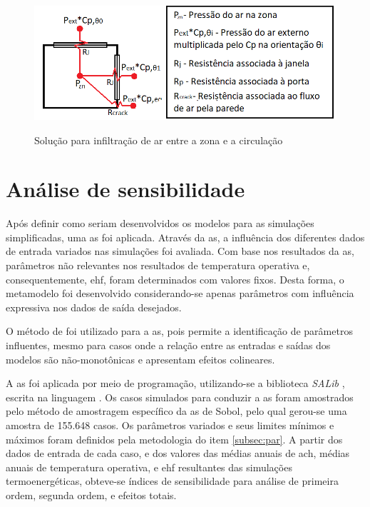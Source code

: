 \documentclass[brazil,hardcopy,openany]{ufscthesis} %
\begin{document}
\begin{figure}[H]
	\centering
	\caption{Solução para infiltração de ar entre a zona e a circulação}
	\includegraphics[width=.8\linewidth]{img/AFN_crack2.png}
	\label{fig:AFN_crack}
\end{figure}

\section{Análise de sensibilidade}

Após definir como seriam desenvolvidos os modelos para as simulações simplificadas, uma \acrfull{as} foi aplicada. Através da \acrshort{as}, a influência dos diferentes dados de entrada variados nas simulações foi avaliada. Com base nos resultados da \acrshort{as}, parâmetros não relevantes nos resultados de temperatura operativa e, consequentemente, \acrfull{ehf}, foram determinados com valores fixos. Desta forma, o metamodelo foi desenvolvido considerando-se apenas parâmetros com influência expressiva nos dados de saída desejados.

O método de  \cite{Sobol1993} foi utilizado para a \acrshort{as}, pois permite a identificação de parâmetros influentes, mesmo para casos onde a relação entre as entradas e saídas dos modelos são não-monotônicas e apresentam efeitos colineares.

A \acrshort{as} foi aplicada por meio de programação, utilizando-se a biblioteca \textit{SALib} \cite{Herman2017}, escrita na linguagem .
Os casos simulados para conduzir a \acrshort{as} foram amostrados pelo método de amostragem específico da \acrshort{as} de Sobol, pelo qual gerou-se uma amostra de 155.648 casos.
Os parâmetros variados e seus limites mínimos e máximos foram definidos pela metodologia do item \ref{subsec:par}. 
A partir dos dados de entrada de cada caso, e dos valores das médias anuais de \acrshort{ach}, médias anuais de temperatura operativa, e \acrshort{ehf} resultantes das simulações termoenergéticas, obteve-se índices de sensibilidade para análise de primeira ordem, segunda ordem, e efeitos totais.
\newpage
\end{document}
